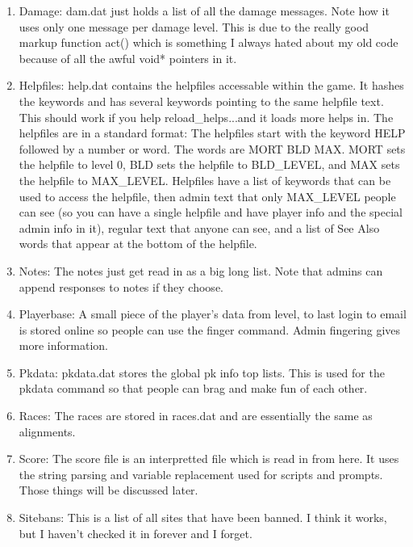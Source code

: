 \begin{enumerate}
\item Damage: dam.dat just holds a list of all the damage
messages. Note how it uses only one message per damage level. This is
due to the really good markup function act() which is something I
always hated about my old code because of all the awful void* pointers
in it.

\item Helpfiles: help.dat contains the helpfiles accessable within the
game. It hashes the keywords and has several keywords pointing to the
same helpfile text. This should work if you help reload\_helps...and
it loads more helps in. The helpfiles are in a standard format: The
helpfiles start with the keyword HELP followed by a number or word.
The words are MORT BLD MAX. MORT sets the helpfile to level 0,
BLD sets the helpfile to BLD\_LEVEL, and MAX sets the helpfile
to MAX\_LEVEL. Helpfiles have a list of keywords that can be used
to access the helpfile, then admin text that only MAX\_LEVEL people
can see (so you can have a single helpfile and have player info
and the special admin info in it), regular text that anyone can
see, and a list of See Also words that appear at the bottom of
the helpfile. 

\item Notes: The notes just get read in as a big long list. Note that
admins can append responses to notes if they choose.

\item Playerbase: A small piece of the player's data from level, to
last login to email is stored online so people can use the finger
command. Admin fingering gives more information.

\item Pkdata: pkdata.dat stores the global pk info top lists. This is
used for the pkdata command so that people can brag and make fun of
each other.

\item Races: The races are stored in races.dat and are essentially the
same as alignments.

\item Score: The score file is an interpretted file which is read in
from here. It uses the string parsing and variable replacement used
for scripts and prompts. Those things will be discussed later.

\item Sitebans: This is a list of all sites that have been banned.  I
think it works, but I haven't checked it in forever and I forget.


\end{enumerate}

